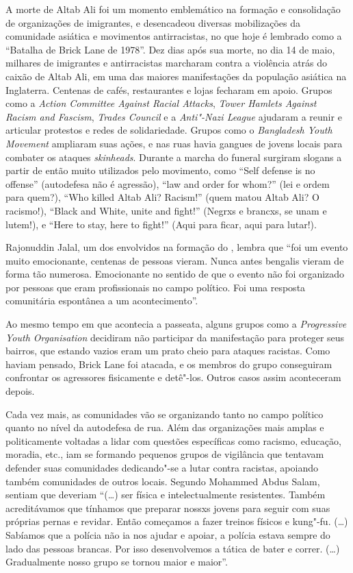 A morte de Altab Ali foi um momento emblemático na formação e consolidação de organizações de imigrantes, e desencadeou diversas mobilizações da comunidade asiática e movimentos antirracistas, no que hoje é lembrado como a ``Batalha de Brick Lane de 1978''. Dez dias após sua morte, no dia 14 de maio, milhares de imigrantes e antirracistas marcharam contra a violência atrás do caixão de Altab Ali, em uma das maiores manifestações da população asiática na Inglaterra. Centenas de cafés, restaurantes e lojas fecharam em apoio. Grupos como a \emph{Action Committee Against Racial Attacks}, \emph{Tower Hamlets Against Racism and Fascism}, \emph{Trades Council} e a \emph{Anti"-Nazi League} ajudaram a reunir e articular protestos e redes de solidariedade. Grupos como o \emph{Bangladesh Youth Movement} ampliaram suas ações, e nas ruas havia gangues de jovens locais para combater os ataques \emph{skinheads}. Durante a marcha do funeral surgiram slogans a partir de então muito utilizados pelo movimento, como ``Self defense is no offense'' (autodefesa não é agressão), ``law and order for whom?'' (lei e ordem para quem?), ``Who killed Altab Ali? Racism!'' (quem matou Altab Ali? O racismo!), ``Black and White, unite and fight!'' (Negrxs e brancxs, se unam e lutem!), e ``Here to stay, here to fight!'' (Aqui para ficar, aqui para lutar!).

Rajonuddin Jalal, um dos envolvidos na formação do , lembra que ``foi um evento muito emocionante, centenas de pessoas vieram. Nunca antes bengalis vieram de forma tão numerosa. Emocionante no sentido de que o evento não foi organizado por pessoas que eram profissionais no campo político. Foi uma resposta comunitária espontânea a um acontecimento''.

Ao mesmo tempo em que acontecia a passeata, alguns grupos como a \emph{Progressive Youth Organisation} decidiram não participar da manifestação para proteger seus bairros, que estando vazios eram um prato cheio para ataques racistas. Como haviam pensado, Brick Lane foi atacada, e os membros do grupo conseguiram confrontar os agressores fisicamente e detê"-los. Outros casos assim aconteceram depois.

Cada vez mais, as comunidades vão se organizando tanto no campo político quanto no nível da autodefesa de rua. Além das organizações mais amplas e politicamente voltadas a lidar com questões específicas como racismo, educação, moradia, etc., iam se formando pequenos grupos de vigilância que tentavam defender suas comunidades dedicando"-se a lutar contra racistas, apoiando também comunidades de outros locais. Segundo Mohammed Abdus Salam, sentiam que deveriam ``(\ldots{}) ser física e intelectualmente resistentes. Também acreditávamos que tínhamos que preparar nossxs jovens para seguir com suas próprias pernas e revidar. Então começamos a fazer treinos físicos e kung"-fu. (\ldots{}) Sabíamos que a polícia não ia nos ajudar e apoiar, a polícia estava sempre do lado das pessoas brancas. Por isso desenvolvemos a tática de bater e correr. (\ldots{}) Gradualmente nosso grupo se tornou maior e maior''.

